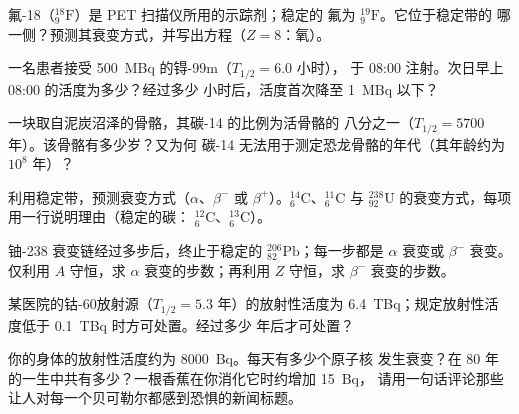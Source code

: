 \begin{exercise}[$\star\star$]\label{exo:g11:nucleus-radioactivity:8}
氟-18（${}^{18}_{9}\mathrm{F}$）是 PET 扫描仪所用的示踪剂；稳定的
氟为 ${}^{19}_{9}\mathrm{F}$。它位于稳定带的
哪一侧？预测其衰变方式，并写出方程（$Z = 8$：氧）。
\end{exercise}

\begin{exercise}[$\star\star$]\label{exo:g11:nucleus-radioactivity:9}
一名患者接受 \qty{500}{MBq} 的锝-99m（$T_{1/2} = 6.0$ 小时），
于 08:00 注射。次日早上 08:00 的活度为多少？经过多少
小时后，活度首次降至 \qty{1}{MBq} 以下？
\end{exercise}

\begin{exercise}[$\star\star$]\label{exo:g11:nucleus-radioactivity:10}
一块取自泥炭沼泽的骨骼，其碳-14 的比例为活骨骼的
八分之一（$T_{1/2} = \num{5700}$ 年）。该骨骼有多少岁？又为何
碳-14 无法用于测定恐龙骨骼的年代（其年龄约为 $10^{8}$ 年）？
\end{exercise}

\begin{exercise}[$\star\star$]\label{exo:g11:nucleus-radioactivity:11}
利用稳定带，预测衰变方式（$\alpha$、$\beta^-$ 或
$\beta^+$）。${}^{14}_{6}\mathrm{C}$、${}^{11}_{6}\mathrm{C}$ 与
${}^{238}_{92}\mathrm{U}$ 的衰变方式，每项用一行说明理由（稳定的碳：
${}^{12}_{6}\mathrm{C}$、${}^{13}_{6}\mathrm{C}$）。
\end{exercise}

\begin{exercise}[$\star\star\star$]\label{exo:g11:nucleus-radioactivity:12}
铀-238 衰变链经过多步后，终止于稳定的
${}^{206}_{82}\mathrm{Pb}$；每一步都是 $\alpha$ 衰变或 $\beta^-$ 衰变。仅利用
$A$ 守恒，求 $\alpha$ 衰变的步数；再利用
$Z$ 守恒，求 $\beta^-$ 衰变的步数。
\end{exercise}

\begin{exercise}[$\star\star\star$]\label{exo:g11:nucleus-radioactivity:13}
某医院的钴-60放射源（$T_{1/2} = 5.3$ 年）的放射性活度为
\qty{6.4}{TBq}；规定放射性活度低于 \qty{0.1}{TBq} 时方可处置。经过多少
年后才可处置？
\end{exercise}

\begin{exercise}[$\star\star\star$]\label{exo:g11:nucleus-radioactivity:14}
你的身体的放射性活度约为 \qty{8000}{Bq}。每天有多少个原子核
发生衰变？在 $80$ 年的一生中共有多少？一根香蕉在你消化它时约增加 \qty{15}{Bq}，
请用一句话评论那些让人对每一个贝可勒尔都感到恐惧的新闻标题。
\end{exercise}

